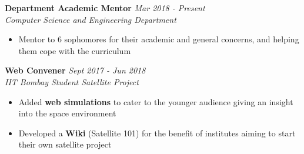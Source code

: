 \documentclass{article}
\begin{document}
\vspace{-1pt}
\textbf{Department Academic Mentor} \hfill{\sl \small Mar 2018 - Present}\\
\textit{Computer Science and Engineering Department}\hfill\\
\vspace{-16pt}
\begin{itemize}[itemsep = -0.75 mm, leftmargin=*]
\item Mentor to 6 sophomores for their academic and general concerns, and helping them cope with the curriculum
\end{itemize}
\vspace{-1pt}
\textbf{Web Convener} \hfill{\sl \small Sept 2017 - Jun 2018}\\
\textit{IIT Bombay Student Satellite Project}\hfill\\
\vspace{-16pt}
\begin{itemize}[itemsep = -0.75 mm, leftmargin=*]
\item Added \textbf{web simulations} to cater to the younger audience giving an insight into the space environment
\item Developed a \textbf{Wiki} (Satellite 101) for the benefit of institutes aiming to start their own satellite project
\end{itemize}
\end{document}

